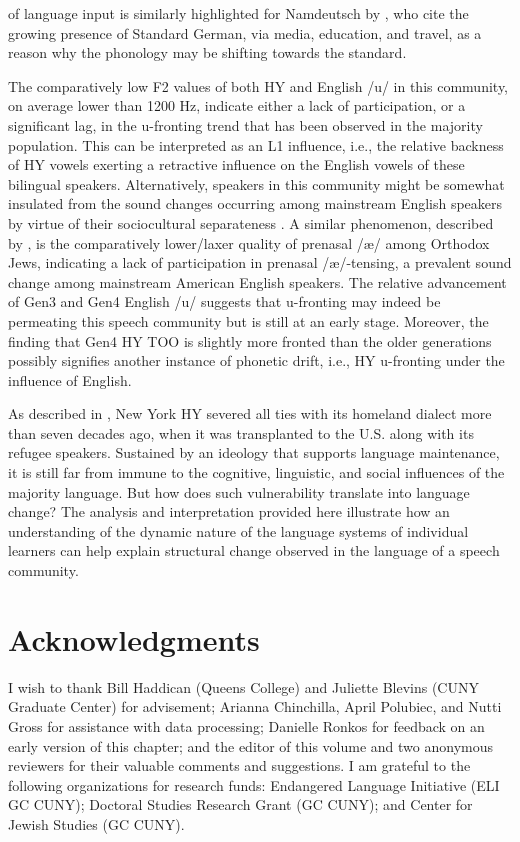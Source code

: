 \documentclass[output=paper]{langsci/langscibook}
\begin{document}
of language input is similarly highlighted for Namdeutsch by , who cite the growing presence of Standard German, via media, education, and travel, as a reason why the phonology may be shifting towards the standard.

The comparatively low F2 values of both HY and English /u/ in this community, on average lower than 1200 Hz, indicate either a lack of participation, or a significant lag, in the u-fronting trend that has been observed in the majority population. This can be interpreted as an L1 influence, i.e., the relative backness of HY vowels exerting a retractive influence on the English vowels of these bilingual speakers. Alternatively, speakers in this community might be somewhat insulated from the sound changes occurring among mainstream English speakers by virtue of their sociocultural separateness \citep{Fader2009}. A similar phenomenon, described by \citet{Benor2009, Benor2012}, is the comparatively lower/laxer quality of prenasal /æ/ among Orthodox Jews, indicating a lack of participation in prenasal /æ/-tensing, a prevalent sound change among mainstream American English speakers. The relative advancement of Gen3 and Gen4 English /u/ suggests that u-fronting may indeed be permeating this speech community but is still at an early stage. Moreover, the finding that Gen4 HY TOO is slightly more fronted than the older generations possibly signifies another instance of phonetic drift, i.e., HY u-fronting under the influence of English. 

As described in , New York HY severed all ties with its homeland dialect more than seven decades ago, when it was transplanted to the U.S. along with its refugee speakers. Sustained by an ideology that supports language maintenance, it is still far from immune to the cognitive, linguistic, and social influences of the majority language. But how does such vulnerability translate into language change? The analysis and interpretation provided here illustrate how an understanding of the dynamic nature of the language systems of individual learners can help explain structural change observed in the language of a speech community. 

\section*{Acknowledgments}
I wish to thank Bill Haddican (Queens College) and Juliette Blevins (CUNY Graduate Center) for advisement; Arianna Chinchilla, April Polubiec, and Nutti Gross for assistance with data processing; Danielle Ronkos for feedback on an early version of this chapter; and the editor of this volume and two anonymous reviewers for their valuable comments and suggestions. I am grateful to the following organizations for research funds: Endangered Language Initiative (ELI GC CUNY); Doctoral Studies Research Grant (GC CUNY); and Center for Jewish Studies (GC CUNY).
\end{document}
